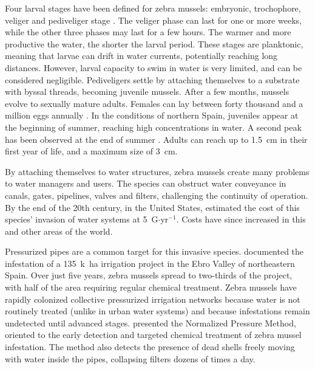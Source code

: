 \documentclass[review,authoryear]{elsarticle}
\begin{document}
Four larval stages have been defined for zebra mussels: embryonic, trochophore,
veliger and pediveliger stage \citep{Cohen09}. The veliger phase can last for
one or more weeks, while the other three phases may last for a few hours. The
warmer and more productive the water, the shorter the larval period. These
stages are planktonic, meaning that larvae can drift in water currents,
potentially reaching long distances. However, larval capacity to swim in water
is very limited, and can be considered negligible. Pediveligers settle by
attaching themselves to a substrate with byssal threads, becoming juvenile
mussels. After a few months, mussels evolve to sexually mature adults. Females
can lay between forty thousand and a million eggs annually \citep{CHE07}. In the
conditions of northern Spain, juveniles appear at the beginning of summer,
reaching high concentrations in water. A second peak has been observed at the
end of summer \citep{Araujo06, URA14}. Adults can reach up to 1.5~cm in their
first year of life, and a maximum size of 3~cm.

By attaching themselves to water structures, zebra mussels create many problems
to water managers and users. The species can obstruct water conveyance in
canals, gates, pipelines, valves and filters, challenging the continuity of
operation. By
the end of the 20th century, in the United States, \citet{Khalanski97} estimated
the cost of this species’ invasion of water systems at
5~G\textdollar$\cdot$yr$^{-1}$. Costs have since increased in this and other
areas of the world.

Pressurized pipes are a common target for this invasive species.
\citet{MoralesHernandez18} documented the infestation of a 135~k~ha irrigation
project in the Ebro Valley of northeastern Spain. Over just five years, zebra
mussels spread to two-thirds of the project, with half of the area requiring
regular chemical treatment. Zebra mussels have rapidly colonized collective
pressurized irrigation networks because water is not routinely treated (unlike
in urban water systems) and because infestations remain undetected until
advanced stages. \citet{MoralesHernandez18, MoralesHernandez22} presented the
Normalized Pressure Method, oriented to the early detection and targeted
chemical treatment of zebra mussel infestation. 
The method also detects the
presence of dead shells freely moving with water inside the pipes, 
collapsing filters dozens
of times a day. 
\end{document}
